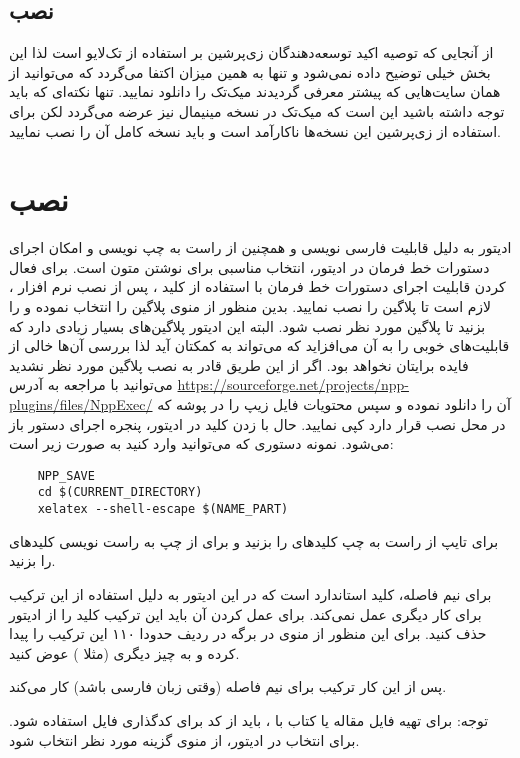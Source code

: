     \subsection{نصب  }
        از آنجایی که توصیه اکید توسعه‌دهندگان زی‌پرشین بر استفاده از تک‌لایو است لذا این بخش خیلی توضیح داده نمی‌شود و تنها به همین میزان 
        اکتفا می‌گردد که می‌توانید از همان سایت‌هایی که پیشتر معرفی گردیدند میک‌تک را دانلود نمایید. تنها نکته‌ای که باید توجه داشته باشید این است 
        که میک‌تک در نسخه‌ مینیمال نیز عرضه می‌گردد لکن برای استفاده از زی‌پرشین این نسخه‌ها ناکارآمد است و باید نسخه کامل آن را نصب نمایید. 
        

    \section{نصب }
    ادیتور   به دلیل قابلیت فارسی نویسی و همچنین از راست به چپ نویسی و امکان اجرای دستورات خط فرمان در ادیتور،
    انتخاب مناسبی برای نوشتن متون  است. برای فعال کردن قابلیت اجرای دستورات خط فرمان با استفاده از کلید ، پس از نصب نرم افزار ، 
    لازم است تا پلاگین  را نصب نمایید. بدین منظور از منوی     
    پلاگین   را انتخاب نموده و  را بزنید تا پلاگین مورد نظر نصب شود. البته این ادیتور پلاگین‌های بسیار زیادی دارد 
    که قابلیت‌های خوبی را به آن می‌افزاید که می‌تواند به کمکتان آید لذا بررسی آن‌ها خالی از فایده برایتان نخواهد بود.
    اگر از این طریق قادر به نصب پلاگین مورد نظر نشدید می‌توانید با مراجعه به آدرس \url{https://sourceforge.net/projects/npp-plugins/files/NppExec/}
    آن را دانلود نموده و سپس محتویات فایل زیپ را  در پوشه  که در محل نصب   قرار دارد کپی نمایید. 
    حال با زدن کلید   در ادیتور، پنجره اجرای دستور باز می‌شود.
    نمونه دستوری که می‌توانید وارد کنید به صورت زیر است:

\begin{latin}
    \begin{Verbatim}
    NPP_SAVE
    cd $(CURRENT_DIRECTORY)
    xelatex --shell-escape $(NAME_PART)
    \end{Verbatim}
\end{latin}    

    برای تایپ از راست به چپ کلیدهای   را بزنید و برای از چپ به راست نویسی کلیدهای   را بزنید.

    برای نیم فاصله، کلید استاندارد   است که در این ادیتور به دلیل استفاده از این ترکیب برای کار دیگری عمل نمی‌کند.
    برای عمل کردن آن باید این ترکیب کلید را از ادیتور حذف کنید. برای این منظور از منوی 
     در برگه   در ردیف حدودا ۱۱۰  این ترکیب را پیدا کرده و به چیز دیگری (مثلا ) عوض کنید.

     پس از این کار ترکیب   برای نیم فاصله (وقتی زبان فارسی باشد) کار می‌کند.
     
     توجه: برای تهیه فایل مقاله یا کتاب با \lr{\XePersian}، باید از کد   برای کدگذاری فایل استفاده شود. برای انتخاب در ادیتور، از منوی
       گزینه مورد نظر انتخاب شود.
